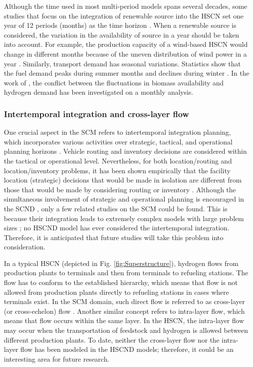 \documentclass[11pt,3p]{elsarticle}
\begin{document}
Although the time used in most multi-period models spans several decades, some studies that focus on the integration of renewable source into the HSCN set one year of 12 periods (months) as the time horizon \citep{kim2016optimization,won2017design,woo2016optimization}. When a renewable source is considered, the variation in the availability of source in a year should be taken into account. For example, the production capacity of a wind-based HSCN would change in different months because of the uneven distribution of wind power in a year \citep{kim2017integrated}. Similarly, transport demand has seasonal variations. Statistics show that the fuel demand peaks during summer months and declines during winter \citep{samsatli2015general}. In the work of \citet{woo2016optimization}, the conflict between the fluctuations in biomass availability and hydrogen demand has been investigated on a monthly analysis.

\subsubsection{Intertemporal integration and cross-layer flow}

One crucial aspect in the SCM refers to intertemporal integration planning, which incorporates various activities over strategic, tactical, and operational planning horizons \citep{shapiro2006modeling}. Vehicle routing and inventory decisions are considered within the tactical or operational level. Nevertheless, for both location/routing and location/inventory problems, it has been shown empirically that the facility location (strategic) decisions that would be made in isolation are different from those that would be made by considering routing or inventory \citep{daskin2005facility}. Although the simultaneous involvement of strategic and operational planning is encouraged in the SCND \citep{yue2014biomass,daskin2005facility}, only a few related studies on the SCM could be found. This is because their integration leads to extremely complex models with large problem sizes \citep{melo2009facility}; no HSCND model has ever considered the intertemporal integration. Therefore, it is anticipated that future studies will take this problem into consideration.

In a typical HSCN (depicted in Fig. \ref{fig:Superstructure}), hydrogen flows from production plants to terminals and then from terminals to refueling stations. The flow has to conform to the established hierarchy, which means that flow is not allowed from production plants directly to refueling stations in cases where terminals exist. In the SCM domain, such direct flow is referred to as cross-layer (or cross-echelon) flow \citep{melo2009facility}. Another similar concept refers to intra-layer flow, which means that flow occurs within the same layer. In the HSCN, the intra-layer flow may occur when the transportation of feedstock and hydrogen is allowed between different production plants. To date, neither the cross-layer flow nor the intra-layer flow has been modeled in the HSCND models; therefore, it could be an interesting area for future research.
\end{document}
